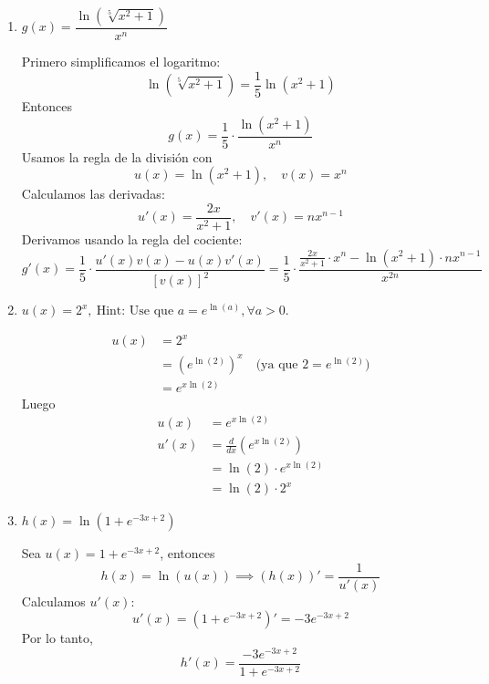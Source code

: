 \documentclass[letterpaper,12pt]{article}
\theoremstyle{plain}
\theoremstyle{definition}
\newcommand{\1}{\mathbbm{1}}
\begin{document}
\begin{enumerate}[label=\textbf{P\arabic*.}, itemsep=0cm]
\begin{enumerate}
 \color{blue}
Sea \( f(x) = u(x) v(x) \) con \( u(x) = \sen^3(x) \) y \( v(x) = \cos^8(x) \). Derivamos usando la regla del producto y de la cadena:
\[
u'(x) = 3 \sen^2(x) \cos(x)
\]
\[
v'(x) = 8 \cos^7(x)(-\sen x) = -8 \cos^7(x) \sen(x)
\]
Por lo tanto,
\[
f'(x) = u'(x)v(x) + u(x)v'(x) = 3 \sen^2(x) \cos(x) \cdot \cos^8(x) - 8 \sen^3(x) \cos^7(x) \sen(x)
\]
\[
 = 3 \sen^2(x) \cos^9(x) - 8 \sen^4(x) \cos^7(x)
\]
\color{black}
    
    \item  \( g(x) = \dfrac{\ln\left( \sqrt[5]{x^2 + 1} \right)}{x^n} \)

 \color{blue}

Primero simplificamos el logaritmo:
\[
\ln\left( \sqrt[5]{x^2 + 1} \right) = \frac{1}{5} \ln(x^2 + 1)
\]
Entonces
\[
g(x) = \frac{1}{5} \cdot \frac{\ln(x^2 + 1)}{x^n}
\]
Usamos la regla de la división con
\[
u(x) = \ln(x^2 + 1), \quad v(x) = x^n
\]
Calculamos las derivadas:
\[
u'(x) = \frac{2x}{x^2 + 1}, \quad v'(x) = n x^{n-1}
\]
Derivamos usando la regla del cociente:
\[
g'(x) = \frac{1}{5} \cdot \frac{u'(x)v(x) - u(x)v'(x)}{[v(x)]^2} = \frac{1}{5} \cdot \frac{\frac{2x}{x^2 + 1} \cdot x^n - \ln(x^2 + 1) \cdot n x^{n-1}}{x^{2n}}
\]  
\color{black}

\item $u(x)=2^x,\ \text{Hint: Use que $a=e^{\ln(a)},\forall a>0$}.$

 \color{blue}
\begin{align*}
u(x) &= 2^x \\
     &= \left(e^{\ln(2)}\right)^x \quad \text{(ya que $2 = e^{\ln(2)}$)} \\
     &= e^{x \ln(2)}
\end{align*} 
Luego 
\begin{align*}
u(x) &= e^{x \ln(2)} \\
u'(x) &= \frac{d}{dx} \left( e^{x \ln(2)} \right) \\
      &= \ln(2) \cdot e^{x \ln(2)} \\
      &= \ln(2) \cdot 2^x
\end{align*}
\color{black}


    
    \item \( h(x) = \ln(1 + e^{-3x + 2}) \)

 \color{blue}
Sea \( u(x) = 1 + e^{-3x + 2} \), entonces
\[
h(x) = \ln(u(x)) \implies (h(x))'=\frac{1}{u'(x)}
\]
Calculamos \( u'(x) \):
\[
u'(x) = \left(1 + e^{-3x + 2}\right)' = -3 e^{-3x + 2}
\]
Por lo tanto,
\[
h'(x) = \frac{-3 e^{-3x + 2}}{1 + e^{-3x + 2}}
\]


\end{enumerate}
\end{enumerate}
\end{document}
